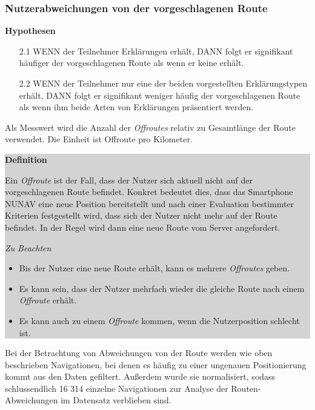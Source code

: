 \subsubsection{Nutzerabweichungen von der vorgeschlagenen Route}

\textbf{Hypothesen}

\begin{enumerate}
    \item[2.1] WENN der Teilnehmer Erklärungen erhält, DANN folgt er signifikant häufiger der vorgeschlagenen Route als wenn er keine erhält.
    \item[2.2] WENN der Teilnehmer nur eine der beiden vorgestellten Erklärungstypen erhält, DANN folgt er signifikant weniger häufig der vorgeschlagenen Route als wenn ihm beide Arten von Erklärungen präsentiert werden.
\end{enumerate}

 Als Messwert wird die Anzahl der \textit{Offroutes} relativ zu Gesamtlänge der Route verwendet. Die Einheit ist Offroute pro Kilometer.

\smallskip

\noindent\colorbox{lightgray}{%
    \parbox{0.975\linewidth}{
        \textbf{Definition}

        Ein \textit{Offroute} ist der Fall, dass der Nutzer sich aktuell nicht auf der vorgeschlagenen Route befindet. Konkret bedeutet dies, dass das Smartphone NUNAV eine neue Position bereitstellt und nach einer Evaluation bestimmter Kriterien festgestellt wird, dass sich der Nutzer nicht mehr auf der Route befindet. In der Regel wird dann eine neue Route vom Server angefordert.
        
        \textit{Zu Beachten}
        \begin{itemize}
            \item Bis der Nutzer eine neue Route erhält, kann es mehrere \textit{Offroutes} geben.
            \item Es kann sein, dass der Nutzer mehrfach wieder die gleiche Route nach einem \textit{Offroute} erhält.
            \item Es kann auch zu einem \textit{Offroute} kommen, wenn die Nutzerposition schlecht ist.
        \end{itemize}
    }
}

\smallskip

Bei der Betrachtung von Abweichungen von der Route werden wie oben beschrieben Navigationen, bei denen es häufig zu einer ungenauen Positionierung kommt aus den Daten gefiltert. Außerdem wurde sie normalisiert, sodass schlussendlich 16 314 einzelne Navigationen zur Analyse der Routen-Abweichungen im Datensatz verblieben sind.

